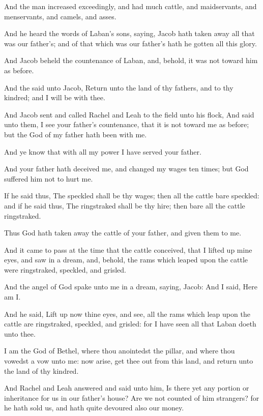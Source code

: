 \Verse And the man increased exceedingly, and had much cattle, and maidservants, and menservants, and camels, and asses.

\Chapter
\Verse And he heard the words of Laban's sons, saying, Jacob hath taken away all that was our father's; and of that which was our father's hath he gotten all this glory.

\Verse And Jacob beheld the countenance of Laban, and, behold, it was not toward him as before.

\Verse And the \LORD said unto Jacob, Return unto the land of thy fathers, and to thy kindred; and I will be with thee.

\Verse And Jacob sent and called Rachel and Leah to the field unto his flock, \Verse And said unto them, I see your father's countenance, that it is not toward me as before; but the God of my father hath been with me.

\Verse And ye know that with all my power I have served your father.

\Verse And your father hath deceived me, and changed my wages ten times; but God suffered him not to hurt me.

\Verse If he said thus, The speckled shall be thy wages; then all the cattle bare speckled: and if he said thus, The ringstraked shall be thy hire; then bare all the cattle ringstraked.

\Verse Thus God hath taken away the cattle of your father, and given them to me.

\Verse And it came to pass at the time that the cattle conceived, that I lifted up mine eyes, and saw in a dream, and, behold, the rams which leaped upon the cattle were ringstraked, speckled, and grisled.

\Verse And the angel of God spake unto me in a dream, saying, Jacob: And I said, Here am I.

\Verse And he said, Lift up now thine eyes, and see, all the rams which leap upon the cattle are ringstraked, speckled, and grisled: for I have seen all that Laban doeth unto thee.

\Verse I am the God of Bethel, where thou anointedst the pillar, and where thou vowedst a vow unto me: now arise, get thee out from this land, and return unto the land of thy kindred.

\Verse And Rachel and Leah answered and said unto him, Is there yet any portion or inheritance for us in our father's house?  \Verse Are we not counted of him strangers? for he hath sold us, and hath quite devoured also our money.


